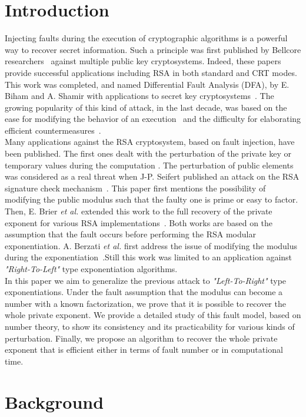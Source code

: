 \documentclass{article}
\begin{document}
\section{Introduction}
Injecting faults during the execution of cryptographic algorithms is a powerful way to recover secret information.
Such a principle was first published by Bellcore researchers~\cite{20,21} against multiple public key cryptosystems. Indeed, these papers provide successful applications including RSA in both standard and CRT modes.
This work was completed, and named Differential Fault Analysis (DFA), by E. Biham and A. Shamir with applications to secret key cryptosystems~\cite{22}. The growing popularity of this kind of attack, in the last decade, was based on the ease for modifying the behavior of an execution~\cite{12} and the difficulty for elaborating efficient countermeasures~\cite{40,43,32}.\\
\indent
Many applications against the RSA cryptosystem, based on fault
injection, have been published. The first ones dealt with the perturbation
of the private key or temporary values during the computation
\cite{20,19,21}. The perturbation of public elements  was considered
as a real threat when J-P. Seifert published an attack on the RSA
signature check mechanism~\cite{67,13}. This paper first mentions the
possibility of modifying the public modulus  such that the faulty
one is prime or easy to factor. Then, E. Brier \textit{et al.}
extended this work to the full recovery of the private exponent 
for various RSA implementations~\cite{6}. Both works are based on the
assumption that the fault occurs before performing the RSA modular
exponentiation. A. Berzati \textit{et al.} first address the issue of
modifying the modulus during the exponentiation~\cite{77}.Still this
work was limited to an application against \textit{"Right-To-Left"}
type exponentiation algorithms.\\
\indent
In this paper we aim to generalize the previous attack to
\textit{"Left-To-Right"} type exponentiations. Under the fault
assumption that the modulus can become a number with a known
factorization, we prove that it is possible to recover the whole
private exponent. We provide a detailed study of this fault model,
based on number theory, to show its consistency and its practicability
for various kinds of perturbation. Finally, we propose an algorithm to
recover the whole private exponent that is efficient either in terms
of fault number or in computational time. 

\section{Background}
\end{document}
